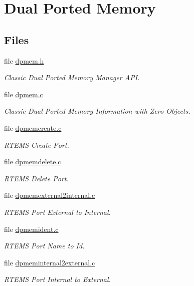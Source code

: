 \hypertarget{group__ClassicDPMEM}{}\section{Dual Ported Memory}
\label{group__ClassicDPMEM}
\subsection*{Files}
\begin{DoxyCompactItemize}
\item 
file \mbox{\hyperlink{dpmem_8h}{dpmem.\+h}}
\begin{DoxyCompactList}\small\item\em Classic Dual Ported Memory Manager A\+PI. \end{DoxyCompactList}\item 
file \mbox{\hyperlink{dpmem_8c}{dpmem.\+c}}
\begin{DoxyCompactList}\small\item\em Classic Dual Ported Memory Information with Zero Objects. \end{DoxyCompactList}\item 
file \mbox{\hyperlink{dpmemcreate_8c}{dpmemcreate.\+c}}
\begin{DoxyCompactList}\small\item\em R\+T\+E\+MS Create Port. \end{DoxyCompactList}\item 
file \mbox{\hyperlink{dpmemdelete_8c}{dpmemdelete.\+c}}
\begin{DoxyCompactList}\small\item\em R\+T\+E\+MS Delete Port. \end{DoxyCompactList}\item 
file \mbox{\hyperlink{dpmemexternal2internal_8c}{dpmemexternal2internal.\+c}}
\begin{DoxyCompactList}\small\item\em R\+T\+E\+MS Port External to Internal. \end{DoxyCompactList}\item 
file \mbox{\hyperlink{dpmemident_8c}{dpmemident.\+c}}
\begin{DoxyCompactList}\small\item\em R\+T\+E\+MS Port Name to Id. \end{DoxyCompactList}\item 
file \mbox{\hyperlink{dpmeminternal2external_8c}{dpmeminternal2external.\+c}}
\begin{DoxyCompactList}\small\item\em R\+T\+E\+MS Port Internal to External. \end{DoxyCompactList}\end{DoxyCompactItemize}
